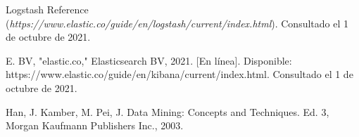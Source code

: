 

\begin{thebibliography}{99}
 Logstash Reference ({\it https://www.elastic.co/guide/en/logstash/current/index.html}). Consultado el 1 de octubre de 2021.

E. BV, "elastic.co," Elasticsearch BV, 2021. [En línea]. Disponible:
https://www.elastic.co/guide/en/kibana/current/index.html. Consultado el 1 de octubre de 2021.

Han, J. Kamber, M. Pei, J. Data Mining: Concepts and Techniques. Ed. 3,
Morgan Kaufmann Publishers Inc., 2003.



\end{thebibliography}

